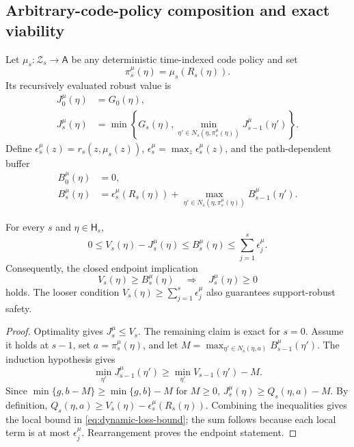 \subsection{Arbitrary-code-policy composition and exact viability}

Let $\mu_s:\mathcal Z_s\to\mathsf A$ be any deterministic time-indexed code policy and set
\[
 \pi_s^\mu(\eta)=\mu_s(R_s(\eta)).
\]
Its recursively evaluated robust value is
\begin{align*}
 J_0^\mu(\eta)&=G_0(\eta),\\
 J_s^\mu(\eta)&=\min\left\{G_s(\eta),
 \min_{\eta'\in N_s(\eta,\pi_s^\mu(\eta))}J_{s-1}^\mu(\eta')\right\}.
\end{align*}
Define $\epsilon_s^\mu(z)=r_s(z,\mu_s(z))$,
$\epsilon_s^\mu=\max_z\epsilon_s^\mu(z)$, and the path-dependent buffer
\begin{align}
 B_0^\mu(\eta)&=0,\nonumber\\
 B_s^\mu(\eta)&=\epsilon_s^\mu(R_s(\eta))
 +\max_{\eta'\in N_s(\eta,\pi_s^\mu(\eta))}B_{s-1}^\mu(\eta').
 \label{eq:path-buffer}
\end{align}

\begin{theorem}
\label{thm:dynamic-representation-loss}
For every $s$ and $\eta\in\mathsf H_s$,
\begin{equation}
 0\leq V_s(\eta)-J_s^\mu(\eta)
 \leq B_s^\mu(\eta)
 \leq\sum_{j=1}^s\epsilon_j^\mu.
 \label{eq:dynamic-loss-bound}
\end{equation}
Consequently, the closed endpoint implication
\[
 V_s(\eta)\geq B_s^\mu(\eta)\quad\Longrightarrow\quad J_s^\mu(\eta)\geq0
\]
holds.  The looser condition $V_s(\eta)\geq\sum_{j=1}^s\epsilon_j^\mu$ also guarantees
support-robust safety.
\end{theorem}

\begin{proof}
Optimality gives $J_s^\mu\leq V_s$.  The remaining claim is exact for $s=0$.  Assume it holds at
$s-1$, set $a=\pi_s^\mu(\eta)$, and let
$M=\max_{\eta'\in N_s(\eta,a)}B_{s-1}^\mu(\eta')$.  The induction hypothesis gives
\[
 \min_{\eta'}J_{s-1}^\mu(\eta')
 \geq\min_{\eta'}V_{s-1}(\eta')-M.
\]
Since $\min\{g,b-M\}\geq\min\{g,b\}-M$ for $M\geq0$,
$J_s^\mu(\eta)\geq Q_s(\eta,a)-M$.  By definition,
$Q_s(\eta,a)\geq V_s(\eta)-\epsilon_s^\mu(R_s(\eta))$.  Combining the inequalities gives the
local bound in \eqref{eq:dynamic-loss-bound}; the sum follows because each local term is at most
$\epsilon_j^\mu$.  Rearrangement proves the endpoint statement.
\end{proof}

